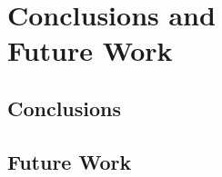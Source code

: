 %

\acresetall

\chapter[Conclusions and Future Work]{Conclusions and \\ Future Work}
\label{ch:ConclusionsAndFutureWork}


\section{Conclusions}
\label{sec:Conclusions}


\section{Future Work}
\label{sec:FutureWork}


